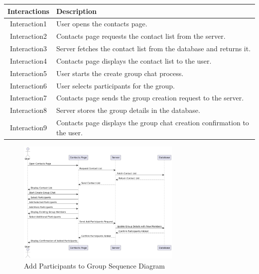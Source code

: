 \begin{longtable}{|c|p{10cm}|}
    \hline
    \textbf{Interactions} & \textbf{Description} \\
    \hline
    Interaction1 & User opens the contacts page. \\
    \hline
    Interaction2 & Contacts page requests the contact list from the server. \\
    \hline
    Interaction3 & Server fetches the contact list from the database and returns it. \\
    \hline
    Interaction4 & Contacts page displays the contact list to the user. \\
    \hline
    Interaction5 & User starts the create group chat process. \\
    \hline
    Interaction6 & User selects participants for the group. \\
    \hline
    Interaction7 & Contacts page sends the group creation request to the server. \\
    \hline
    Interaction8 & Server stores the group details in the database. \\
    \hline
    Interaction9 & Contacts page displays the group chat creation confirmation to the user. \\
    \hline
\end{longtable}
\newpage

\begin{figure}[h]
    \centering
    \includegraphics[width=0.7\textwidth]{images/add_to_grup.png} %
    \caption{Add Participants to Group Sequence Diagram}
    \label{fig:example}
\end{figure}


